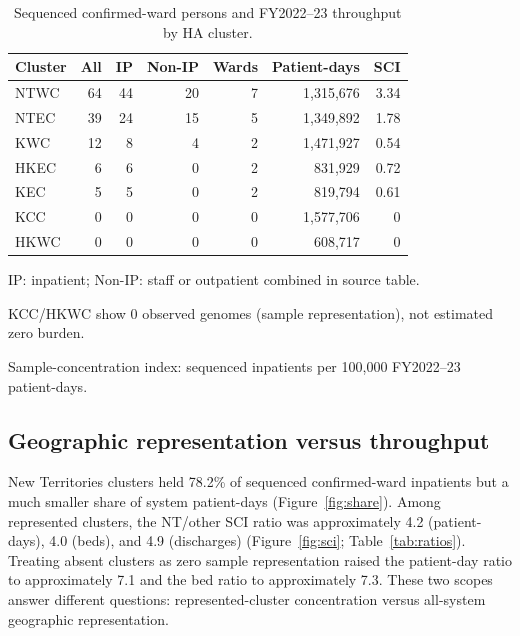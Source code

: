 \documentclass[11pt]{article}
\begin{document}
\begin{table}[tbp]
\centering
\begin{threeparttable}
\caption{Sequenced confirmed-ward persons and FY2022--23 throughput by HA cluster.}
\label{tab:cluster}
\begin{tabular}{lrrrrrr}
\toprule
Cluster & All & IP & Non-IP & Wards & Patient-days & SCI\tnote{a} \\
\midrule
NTWC & 64 & 44 & 20 & 7 & 1{,}315{,}676 & 3.34 \\
NTEC & 39 & 24 & 15 & 5 & 1{,}349{,}892 & 1.78 \\
KWC  & 12 & 8 & 4 & 2 & 1{,}471{,}927 & 0.54 \\
HKEC & 6 & 6 & 0 & 2 & 831{,}929 & 0.72 \\
KEC  & 5 & 5 & 0 & 2 & 819{,}794 & 0.61 \\
KCC  & 0 & 0 & 0 & 0 & 1{,}577{,}706 & 0 \\
HKWC & 0 & 0 & 0 & 0 & 608{,}717 & 0 \\
\bottomrule
\end{tabular}
\begin{tablenotes}
\footnotesize
\item IP: inpatient; Non-IP: staff or outpatient combined in source table.
\item KCC/HKWC show 0 observed genomes (sample representation), not estimated zero burden.
\item[\textbf{a}] Sample-concentration index: sequenced inpatients per 100{,}000 FY2022--23 patient-days.
\end{tablenotes}
\end{threeparttable}
\end{table}

\subsection{Geographic representation versus throughput}
New Territories clusters held 78.2\% of sequenced confirmed-ward inpatients but a much smaller share of system patient-days (Figure~\ref{fig:share}).
Among represented clusters, the NT/other SCI ratio was approximately 4.2 (patient-days), 4.0 (beds), and 4.9 (discharges) (Figure~\ref{fig:sci}; Table~\ref{tab:ratios}).
Treating absent clusters as zero sample representation raised the patient-day ratio to approximately 7.1 and the bed ratio to approximately 7.3.
These two scopes answer different questions: represented-cluster concentration versus all-system geographic representation.
\end{document}
